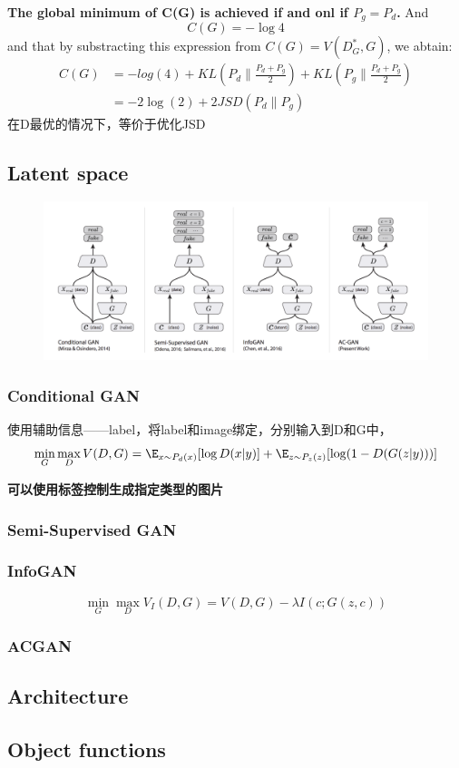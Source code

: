 \textbf{The global minimum of C(G) is achieved if and onl if $P_g = P_d$.} And
\begin{equation}
    C(G) = - \log 4
\end{equation}
and that by substracting this expression from $C(G) = V(D_G^*, G)$, we abtain:
\begin{equation}
    \begin{split}
        C(G) &= -log(4) + KL(P_d\| \frac{P_d + P_g}{2}) + KL(P_g \| \frac{P_d + P_g}{2}) \\
        &= -2\log(2) + 2JSD(P_d\|P_g)
    \end{split}
\end{equation}
在D最优的情况下，等价于优化JSD

\subsection{Latent space}
\begin{figure}[H]
    \centering
    \includegraphics[width=16cm]{images/cgan_acgan.png}
    \label{fig:CGAN2ACGAN}
\end{figure}
\subsubsection{Conditional GAN}
使用辅助信息——label，将label和image绑定，分别输入到D和G中，
\begin{equation}
    \min_G \max_D V(D, G) = \E_{x \sim P_d(x)}[\log D(x|y)] + \E_{z \sim P_{z}(z)}[\log (1 - D(G(z|y)))]
\end{equation}

\textbf{可以使用标签控制生成指定类型的图片}
\subsubsection{Semi-Supervised GAN}


\subsubsection{InfoGAN}
\begin{equation}
    \min_G \max_D V_I(D, G) = V(D, G) - \lambda I(c; G(z,c))
\end{equation}

\subsubsection{ACGAN}

\subsection{Architecture}

\subsection{Object functions}

